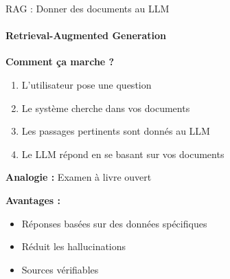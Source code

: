 \begin{frame}{RAG : Donner des documents au LLM}
\framesubtitle{Retrieval-Augmented Generation}

\textbf{Comment ça marche ?}

\vspace{0.3cm}

\begin{enumerate}
    \item[\textbf{1.}] L'utilisateur pose une question
    \item[\textbf{2.}] Le système cherche dans vos documents
    \item[\textbf{3.}] Les passages pertinents sont donnés au LLM
    \item[\textbf{4.}] Le LLM répond en se basant sur vos documents
\end{enumerate}

\vspace{0.5cm}

\textbf{Analogie :} Examen à livre ouvert

\vspace{0.5cm}
\textbf{Avantages :}
\begin{itemize}
    \item Réponses basées sur des données spécifiques
    \item Réduit les hallucinations
    \item Sources vérifiables
\end{itemize}

\end{frame}

